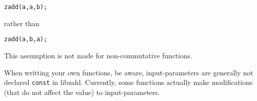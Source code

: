 \begin{alltt}
   zadd(a, a, b);
\end{alltt}

\noindent
rather than

\begin{alltt}
   zadd(a, b, a);
\end{alltt}

\noindent
This assumption is not made for non-commutative
functions.

When writting your own functions, be aware,
input-parameters are generally not declared {\tt const}
in libzahl. Currently, some functions actually make
modifications (that do not affect the value) to
input-parameters.
